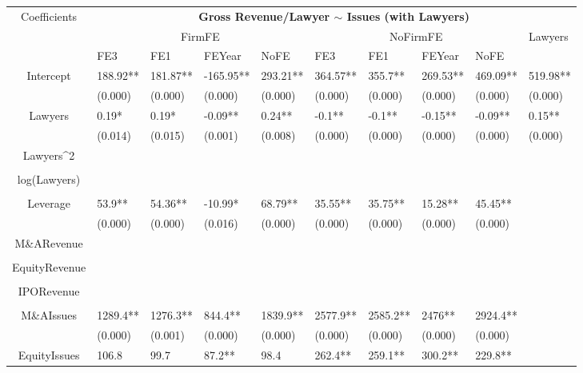 \documentclass{article}
\begin{document}
\begin{table}[H]
\centering
\begin{tabular}{|clllllllll|}
\hline
\multirow{3}{*}{Coefficients} & \multicolumn{9}{c|}{\textbf{Gross Revenue/Lawyer $\sim$ Issues (with Lawyers)}} \\
\cline{2-10}
& \multicolumn{4}{c}{FirmFE} & \multicolumn{4}{c}{NoFirmFE} & \multirow{2}{*}{Lawyers} \\
\cline{2-9}
& FE3 & FE1 & FEYear & NoFE & FE3 & FE1 & FEYear & NoFE &  \\
\hline
 
Intercept & 188.92** & 181.87** & -165.95** & 293.21** & 364.57** & 355.7** & 269.53** & 469.09** & 519.98** \\ 
   & (0.000) & (0.000) & (0.000) & (0.000) & (0.000) & (0.000) & (0.000) & (0.000) & (0.000) \\ 
  Lawyers & 0.19* & 0.19* & -0.09** & 0.24** & -0.1** & -0.1** & -0.15** & -0.09** & 0.15** \\ 
   & (0.014) & (0.015) & (0.001) & (0.008) & (0.000) & (0.000) & (0.000) & (0.000) & (0.000) \\ 
  Lawyers^2 &  &  &  &  &  &  &  &  &  \\ 
   &  &  &  &  &  &  &  &  &  \\ 
  log(Lawyers) &  &  &  &  &  &  &  &  &  \\ 
   &  &  &  &  &  &  &  &  &  \\ 
  Leverage & 53.9** & 54.36** & -10.99* & 68.79** & 35.55** & 35.75** & 15.28** & 45.45** &  \\ 
   & (0.000) & (0.000) & (0.016) & (0.000) & (0.000) & (0.000) & (0.000) & (0.000) &  \\ 
  M\&ARevenue &  &  &  &  &  &  &  &  &  \\ 
   &  &  &  &  &  &  &  &  &  \\ 
  EquityRevenue &  &  &  &  &  &  &  &  &  \\ 
   &  &  &  &  &  &  &  &  &  \\ 
  IPORevenue &  &  &  &  &  &  &  &  &  \\ 
   &  &  &  &  &  &  &  &  &  \\ 
  M\&AIssues & 1289.4** & 1276.3** & 844.4** & 1839.9** & 2577.9** & 2585.2** & 2476** & 2924.4** &  \\ 
   & (0.000) & (0.001) & (0.000) & (0.000) & (0.000) & (0.000) & (0.000) & (0.000) &  \\ 
  EquityIssues & 106.8 & 99.7 & 87.2** & 98.4 & 262.4** & 259.1** & 300.2** & 229.8** &  \\ 

\end{tabular}
\end{table}
\end{document}
